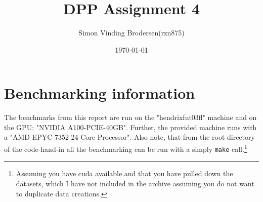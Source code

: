 \documentclass{article}
\title{DPP Assignment 4}
\author{Simon Vinding Brodersen(rzn875)}
\date{\today}
\begin{document}
\maketitle

\section*{Benchmarking information}
The benchmarks from this report are run on the "hendrixfut03fl" machine and on
the GPU: "NVIDIA A100-PCIE-40GB". Further, the provided machine runs with a
"AMD EPYC 7352 24-Core Processor". Also note, that from the root directory of
the code-hand-in all the benchmarking can be run with a simply \texttt{make}
call.\footnote{Assuming you have cuda available and that you have pulled down
the datasets, which I have not included in the archive assuming you do not want
to duplicate data creations.}





\end{document}
